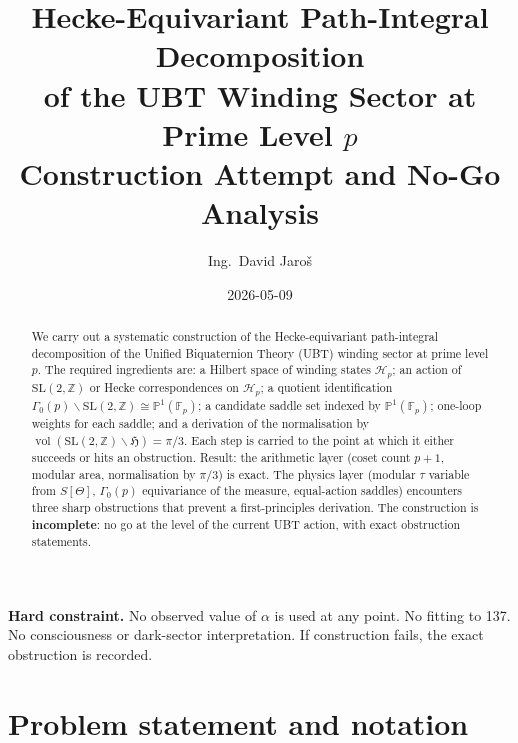 \documentclass[12pt,a4paper]{article}
\title{\textbf{Hecke-Equivariant Path-Integral Decomposition\\
       of the UBT Winding Sector at Prime Level $p$}\\[4pt]
       \large Construction Attempt and No-Go Analysis}
\author{Ing.\ David Jaro\v{s}}
\date{2026-05-09}
\theoremstyle{definition}
\theoremstyle{remark}
\newcommand{\SL}{\mathrm{SL}}
\newcommand{\vol}{\operatorname{vol}}
\newcommand{\bH}{\mathfrak{H}}     %
\newcommand{\ZZ}{\mathbb{Z}}
\newcommand{\FF}{\mathbb{F}}
\newcommand{\PP}{\mathbb{P}}
\newcommand{\Gam}{\Gamma}
\newcommand{\Hp}{\mathcal{H}_p}
\begin{document}
\maketitle

\begin{abstract}
We carry out a systematic construction of the Hecke-equivariant
path-integral decomposition of the Unified Biquaternion Theory (UBT)
winding sector at prime level $p$.  The required ingredients are:
a Hilbert space of winding states $\Hp$; an action of $\SL(2,\ZZ)$ or
Hecke correspondences on $\Hp$; a quotient identification
$\Gam_0(p)\backslash\SL(2,\ZZ)\cong\PP^1(\FF_p)$; a candidate saddle set
indexed by $\PP^1(\FF_p)$; one-loop weights for each saddle; and a
derivation of the normalisation by
$\vol(\SL(2,\ZZ)\backslash\bH)=\pi/3$.
Each step is carried to the point at which it either succeeds or hits an
obstruction.  Result: the arithmetic layer (coset count $p+1$, modular
area, normalisation by $\pi/3$) is exact.  The physics layer (modular
$\tau$ variable from $S[\Theta]$, $\Gam_0(p)$ equivariance of the
measure, equal-action saddles) encounters three sharp obstructions that
prevent a first-principles derivation.  The construction is
\textbf{incomplete}: no go at the level of the current UBT action, with
exact obstruction statements.
\end{abstract}

\begin{warnbox}
\textbf{Hard constraint.} No observed value of $\alpha$ is used at any
point.  No fitting to 137.  No consciousness or dark-sector
interpretation.  If construction fails, the exact obstruction is
recorded.
\end{warnbox}

\tableofcontents
\newpage

\section{Problem statement and notation}
\label{sec:problem}
\end{document}
